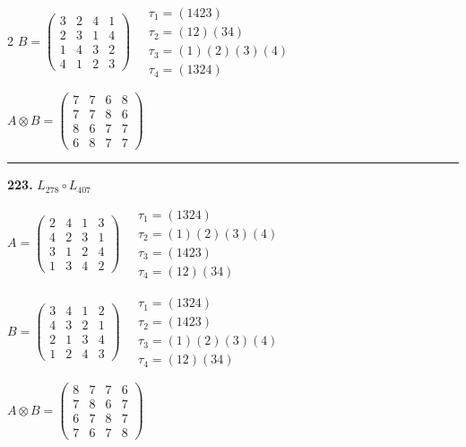 \begin{multicols}{2}
$B = \begin{pmatrix} 3 & 2 & 4 & 1 \\ 2 & 3 & 1 & 4 \\ 1 & 4 & 3 & 2 \\ 4 & 1 & 2 & 3 \end{pmatrix} \quad \begin{matrix} \tau_{1}=(1 4 2 3) \\ \tau_{2}=(1 2)(3 4) \\ \tau_{3}=(1)(2)(3)(4) \\ \tau_{4}=(1 3 2 4) \end{matrix}$

$A \otimes B = \begin{pmatrix} 7 & 7 & 6 & 8 \\ 7 & 7 & 8 & 6 \\ 8 & 6 & 7 & 7 \\ 6 & 8 & 7 & 7 \end{pmatrix}$

\vspace{0.3em}
\hrule
\vspace{0.3em}

\noindent\textbf{223.} $L_{278} \circ L_{407}$

$A = \begin{pmatrix} 2 & 4 & 1 & 3 \\ 4 & 2 & 3 & 1 \\ 3 & 1 & 2 & 4 \\ 1 & 3 & 4 & 2 \end{pmatrix} \quad \begin{matrix} \tau_{1}=(1 3 2 4) \\ \tau_{2}=(1)(2)(3)(4) \\ \tau_{3}=(1 4 2 3) \\ \tau_{4}=(1 2)(3 4) \end{matrix}$

$B = \begin{pmatrix} 3 & 4 & 1 & 2 \\ 4 & 3 & 2 & 1 \\ 2 & 1 & 3 & 4 \\ 1 & 2 & 4 & 3 \end{pmatrix} \quad \begin{matrix} \tau_{1}=(1 3 2 4) \\ \tau_{2}=(1 4 2 3) \\ \tau_{3}=(1)(2)(3)(4) \\ \tau_{4}=(1 2)(3 4) \end{matrix}$

$A \otimes B = \begin{pmatrix} 8 & 7 & 7 & 6 \\ 7 & 8 & 6 & 7 \\ 6 & 7 & 8 & 7 \\ 7 & 6 & 7 & 8 \end{pmatrix}$


\end{multicols}

